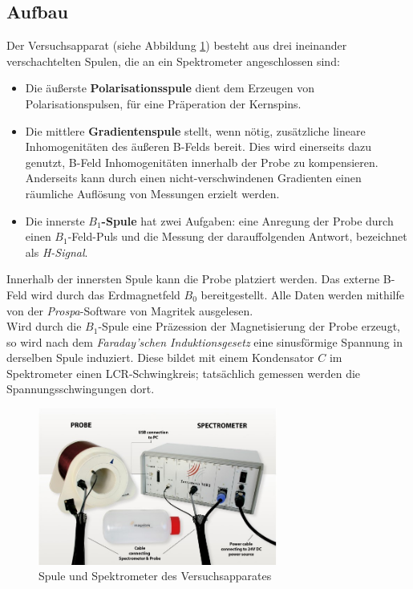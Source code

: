 \documentclass[../main.tex]{subfiles}
\begin{document}
\subsection{Aufbau}
    Der Versuchsapparat (siehe Abbildung \ref{fig:Versuchsaufbau}) besteht aus drei ineinander verschachtelten Spulen, die an ein Spektrometer angeschlossen sind:
    \begin{itemize}
        \item Die äußerste \textbf{Polarisationsspule} dient dem Erzeugen von Polarisationspulsen, für eine Präperation der Kernspins.
        \item Die mittlere \textbf{Gradientenspule} stellt, wenn nötig, zusätzliche lineare Inhomogenitäten des äußeren B-Felds bereit. Dies wird einerseits dazu genutzt, B-Feld Inhomogenitäten innerhalb der Probe zu kompensieren. Anderseits kann durch einen nicht-verschwindenen Gradienten einen räumliche Auflösung von Messungen erzielt werden.
        \item Die innerste \textbf{$B_1$-Spule} hat zwei Aufgaben: eine Anregung der Probe durch einen $B_1$-Feld-Puls und die Messung der darauffolgenden Antwort, bezeichnet als \textit{H-Signal}.
    \end{itemize}
    Innerhalb der innersten Spule kann die Probe platziert werden. Das externe B-Feld wird durch das Erdmagnetfeld $B_0$ bereitgestellt. Alle Daten werden mithilfe von der \textit{Prospa}-Software von Magritek ausgelesen.\\
    
    Wird durch die $B_1$-Spule eine Präzession der Magnetisierung der Probe erzeugt, so wird nach dem \textit{Faraday'schen Induktionsgesetz} eine sinusförmige Spannung in derselben Spule induziert. Diese bildet mit einem Kondensator $C$ im Spektrometer einen LCR-Schwingkreis; tatsächlich gemessen werden die Spannungsschwingungen dort.

    \begin{figure}[H]
        \centering
        \includegraphics[width=0.7\textwidth]{Bilddateien/Versuchsaufbau.jpg}
        \caption{Spule und Spektrometer des Versuchsapparates \cite[p.10]{doc:EFNMRStudentManual}}
        \label{fig:Versuchsaufbau}
    \end{figure}
\end{document}
